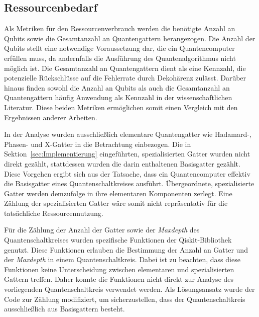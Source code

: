 \subsection*{Ressourcenbedarf}
Als Metriken für den Ressourcenverbrauch werden die benötigte Anzahl an Qubits sowie die Gesamtanzahl an Quantengattern herangezogen. 
Die Anzahl der Qubits stellt eine notwendige Voraussetzung dar, 
die ein Quantencomputer erfüllen muss, da andernfalls die Ausführung des Quantenalgorithmus nicht möglich ist. 
Die Gesamtanzahl an Quantengattern dient als eine Kennzahl, 
die potenzielle Rückschlüsse auf die Fehlerrate durch Dekohärenz zulässt. 
Darüber hinaus finden sowohl die Anzahl an Qubits als auch die Gesamtanzahl an Quantengattern häufig Anwendung als Kennzahl in der wissenschaftlichen Literatur. 
Diese beiden Metriken ermöglichen somit einen Vergleich mit den Ergebnissen anderer Arbeiten.

In der Analyse wurden ausschließlich elementare Quantengatter wie Hadamard-, Phasen- und X-Gatter in die Betrachtung einbezogen. 
Die in Sektion~\ref{sec:Implementierung} eingeführten, spezialisierten Gatter wurden nicht direkt gezählt, 
stattdessen wurden die darin enthaltenen Basisgatter gezählt. 
Diese Vorgehen ergibt sich aus der Tatsache, dass ein Quantencomputer effektiv die Basisgatter eines Quantenschaltkreises ausführt. 
Übergeordnete, spezialisierte Gatter werden demzufolge in ihre elementaren Komponenten zerlegt. 
Eine Zählung der spezialisierten Gatter wäre somit nicht repräsentativ für die tatsächliche Ressourcennutzung.

Für die Zählung der Anzahl der Gatter sowie der \textit{Maxdepth} des Quantenschaltkreises wurden spezifische Funktionen der Qiskit-Bibliothek genutzt. 
Diese Funktionen erlauben die Bestimmung der Anzahl an Gatter und der \textit{Maxdepth} in einem Quantenschaltkreis.
Dabei ist zu beachten, dass diese Funktionen keine Unterscheidung zwischen elementaren und spezialisierten Gattern treffen.
Daher konnte die Funktionen nicht direkt zur Analyse des vorliegenden Quantenschaltkreis verwendet werden. 
Als Lösungsansatz wurde der Code zur Zählung modifiziert, um sicherzustellen, dass der Quantenschaltkreis ausschließlich aus Basisgattern besteht.

